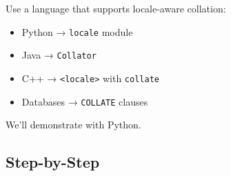 \documentclass[
  letterpaper,
  DIV=11,
  numbers=noendperiod]{scrreprt}
\providecommand{\tightlist}{%
  \setlength{\itemsep}{0pt}\setlength{\parskip}{0pt}}
\begin{document}
Use a language that supports locale-aware collation:

\begin{itemize}
\tightlist
\item
  Python → \texttt{locale} module
\item
  Java → \texttt{Collator}
\item
  C++ → \texttt{\textless{}locale\textgreater{}} with \texttt{collate}
\item
  Databases → \texttt{COLLATE} clauses
\end{itemize}

We'll demonstrate with Python.

\subsection{Step-by-Step}\label{step-by-step-6}
\end{document}
